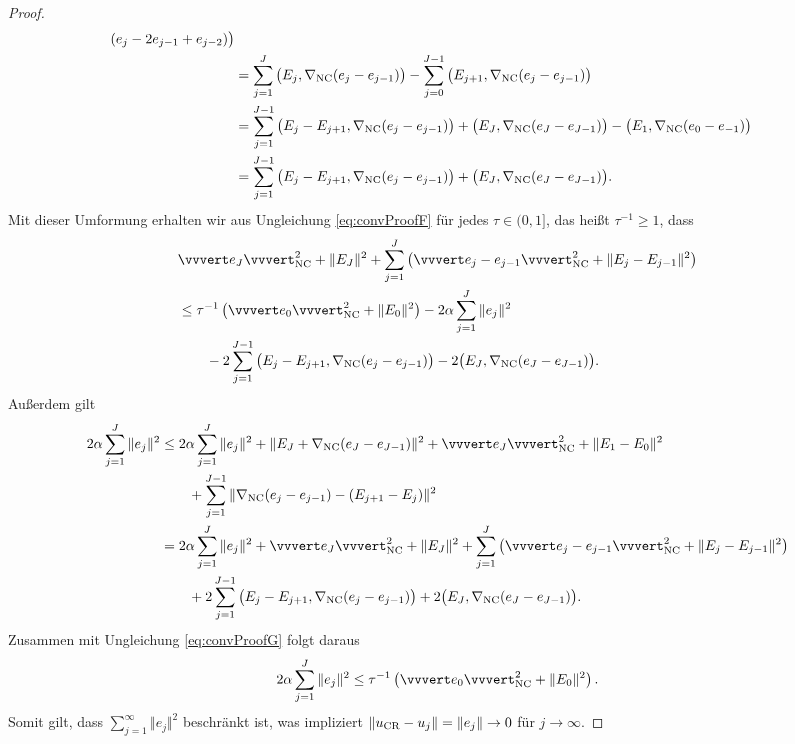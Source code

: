 \begin{proof}
\begin{align*}
    (e_j-2e_{j-1}+e_{j-2})\big)\\
    &=\sum_{j=1}^J\big(E_j,\nabla_\textup{NC}(e_j-e_{j-1})\big)
    -
    \sum_{j=0}^{J-1}\big(E_{j+1},\nabla_\textup{NC}(e_j-e_{j-1})\big) \\
    &= 
    \sum_{j=1}^{J-1} 
    \big(E_j-E_{j+1},\nabla_\textup{NC}(e_j-e_{j-1})\big)
    +\big(E_J,\nabla_\textup{NC}(e_J-e_{J-1})\big)
    - \big(E_1, \nabla_\textup{NC}(e_0-e_{-1})\big) \\
    &= 
    \sum_{j=1}^{J-1} 
    \big(E_j-E_{j+1},\nabla_\textup{NC}(e_j-e_{j-1})\big)
    +\big(E_J,\nabla_\textup{NC}(e_J-e_{J-1})\big).
  \end{align*}
  Mit dieser Umformung erhalten wir aus Ungleichung \eqref{eq:convProofF} für
  jedes $\tau\in(0,1]$, das heißt $\tau^{-1}\geq 1$, dass
  \begin{equation}
    \label{eq:convProofG}
    \begin{aligned}
      &\vvvert e_J \vvvert^2_\nc +\Vert E_J \Vert^2 
      +\sum_{j=1}^J\left(\vvvert e_j-e_{j-1} \vvvert_\nc^2 + 
      \Vert E_j-E_{j-1}\Vert^2\right) \\
      &\leq 
      \tau^{-1}\left(\vvvert e_0 \vvvert_\nc^2 + \Vert E_0 \Vert^2 \right)
      -2\alpha\sum_{j=1}^J \Vert e_j\Vert^2 \\
      &\quad\quad
      -2 \sum_{j=1}^{J-1} \big(E_j-E_{j+1},\gradnc(e_j-e_{j-1})\big)
      -2\big(E_J,\gradnc(e_J-e_{J-1})\big).
    \end{aligned}
  \end{equation}
  Außerdem gilt
  \begin{align*}
    2\alpha\sum_{j=1}^J\Vert e_j\Vert^2 
    &\leq
    2\alpha\sum_{j=1}^J\Vert e_j\Vert^2
    +\Vert E_J + \gradnc(e_J-e_{J-1}) \Vert^2 
    + \vvvert e_J \vvvert^2_\nc 
    + \Vert E_1 - E_0 \Vert^2 \\
    &\quad\quad
    + \sum_{j=1}^{J-1}  
      \Vert \gradnc(e_j-e_{j-1}) - (E_{j+1} - E_j ) \Vert^2 \\
    &= 
    2\alpha\sum_{j=1}^J\Vert e_j\Vert^2
    +\vvvert e_J \vvvert^2_\nc + \Vert E_J \Vert^2 
    + \sum_{j=1}^J \left( \vvvert e_j-e_{j-1} \vvvert^2_\nc
    + \Vert E_j - E_{j-1} \Vert^2 \right)\\
    &\quad\quad
    + 2\sum_{j=1}^{J-1}\big(E_j-E_{j+1},\gradnc(e_j-e_{j-1})\big)
    + 2\big(E_{J},\gradnc(e_J-e_{J-1})\big).
  \end{align*}
  Zusammen mit Ungleichung \eqref{eq:convProofG} folgt daraus
  \begin{align*}
    2\alpha\sum_{j=1}^J\Vert e_j\Vert^2 
    \leq
    \tau^{-1}\left(\vvvert e_0\vvvert^2_\nc + \Vert E_0\Vert^2\right).
  \end{align*}
  Somit gilt, dass $\sum_{j=1}^\infty \Vert e_j\Vert^2$ beschränkt
  ist, was impliziert $\Vert u_\textup{CR}-u_j\Vert=\Vert e_j\Vert\rightarrow 0$ für
  $j\rightarrow \infty$.
\end{proof}
